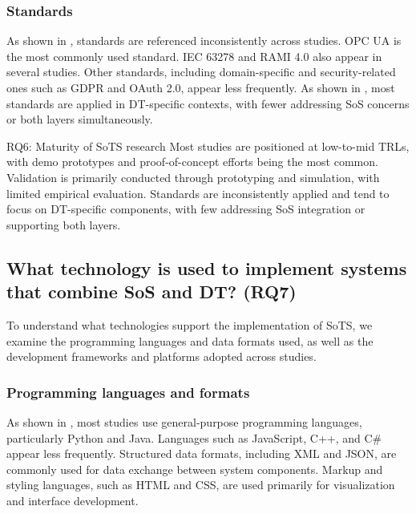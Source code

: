 \subsubsection{Standards}\label{sec:standards}


As shown in , standards are referenced inconsistently across studies. OPC UA is the most commonly used standard. IEC 63278 and RAMI 4.0 also appear in several studies. Other standards, including domain-specific and security-related ones such as GDPR and OAuth 2.0, appear less frequently. As shown in , most standards are applied in DT-specific contexts, with fewer addressing SoS concerns or both layers simultaneously.

\begin{conclusionframe}{RQ6: Maturity of SoTS research}
Most studies are positioned at low-to-mid TRLs, with demo prototypes and proof-of-concept efforts being the most common. Validation is primarily conducted through prototyping and simulation, with limited empirical evaluation. Standards are inconsistently applied and tend to focus on DT-specific components, with few addressing SoS integration or supporting both layers.
\end{conclusionframe}


\subsection{What technology is used to implement systems that combine SoS and DT? (RQ7)}\label{results-rq7}

To understand what technologies support the implementation of SoTS, we examine the programming languages and data formats used, as well as the development frameworks and platforms adopted across studies.

\subsubsection{Programming languages and formats}\label{sec:programming-languages}
 
As shown in , most studies use general-purpose programming languages, particularly Python and Java. Languages such as JavaScript, C++, and C\# appear less frequently. Structured data formats, including XML and JSON, are commonly used for data exchange between system components. Markup and styling languages, such as HTML and CSS, are used primarily for visualization and interface development.

